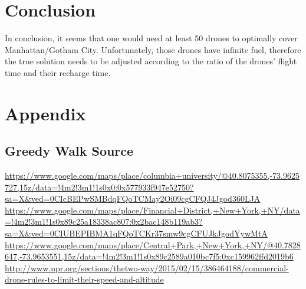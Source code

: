 \documentclass{article}
\begin{document}
\section{Conclusion}
\label{sec:conclusion}
In conclusion, it seems that one would need at least 50 drones to optimally cover Manhattan/Gotham City. Unfortunately, those drones have infinite fuel, therefore the true solution needs to be adjusted according to the ratio of the drones' flight time and their recharge time.

\section{Appendix}
\label{sec:appendix}

\subsection{Greedy Walk Source}
\label{sub:greedy_walk_source}



\begin{thebibliography}{9}
    \url{https://www.google.com/maps/place/columbia+university/@40.8075355,-73.9625727,15z/data=!4m2!3m1!1s0x0:0x577933f947e52750?sa=X&ved=0CIcBEPwSMBdqFQoTCMay2Oi09cgCFQJ4Jgod360LJA}
    \url{https://www.google.com/maps/place/Financial+District,+New+York,+NY/data=!4m2!3m1!1s0x89c25a18338ac807:0x2bac148b119ab3?sa=X&ved=0CIUBEPIBMA1qFQoTCKr37smw9cgCFUJkJgodYywMtA}
    \url{https://www.google.com/maps/place/Central+Park,+New+York,+NY/@40.7828647,-73.9653551,15z/data=!4m2!3m1!1s0x89c2589a010bc7f5:0xc159962ffd2019b6}
    \url{http://www.npr.org/sections/thetwo-way/2015/02/15/386464188/commercial-drone-rules-to-limit-their-speed-and-altitude}
\end{thebibliography}
\end{document}
